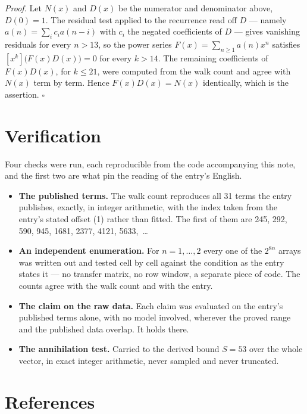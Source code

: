 \documentclass[11pt]{article}
\theoremstyle{definition}
\begin{document}
{\itshape Proof.} Let $N(x)$ and $D(x)$ be the numerator and denominator above, $D(0)=1$. The residual test applied to the recurrence read off $D$ --- namely $a(n) = \sum_i c_i a(n-i)$ with $c_i$ the negated coefficients of $D$ --- gives vanishing residuals for every $n > 13$, so the power series $F(x)=\sum_{n\ge 1}a(n)x^n$ satisfies $[x^k]\bigl(F(x)D(x)\bigr) = 0$ for every $k > 14$. The remaining coefficients of $F(x)D(x)$, for $k \le 21$, were computed from the walk count and agree with $N(x)$ term by term. Hence $F(x)D(x) = N(x)$ identically, which is the assertion. $\square$

\section{Verification}

Four checks were run, each reproducible from the code accompanying this note, and the first two are what pin the reading of the entry's English.

\begin{itemize}

\item {\bfseries The published terms.} The walk count reproduces all 31 terms the entry publishes, exactly, in integer arithmetic, with the index taken from the entry's stated offset (1) rather than fitted. The first of them are 245, 292, 590, 945, 1681, 2377, 4121, 5633,~\dots

\item {\bfseries An independent enumeration.} For $n = 1,\dots,2$ every one of the $2^{8n}$ arrays was written out and tested cell by cell against the condition as the entry states it --- no transfer matrix, no row window, a separate piece of code. The counts agree with the walk count and with the entry.

\item {\bfseries The claim on the raw data.} Each claim was evaluated on the entry's published terms alone, with no model involved, wherever the proved range and the published data overlap. It holds there.

\item {\bfseries The annihilation test.} Carried to the derived bound $S = 53$ over the whole vector, in exact integer arithmetic, never sampled and never truncated.

\end{itemize}

\section{References}
\end{document}
